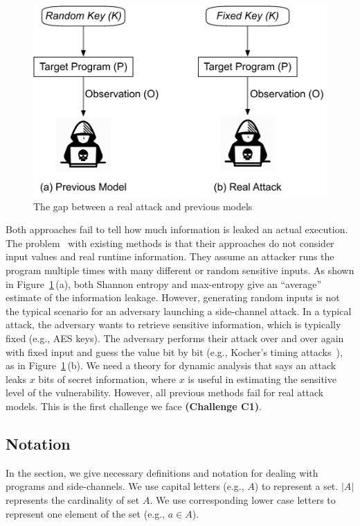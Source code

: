 \begin{figure}[h]
    \vspace*{-5pt}
    \centering
    \includegraphics[width=.65\columnwidth]{./figures/RA.pdf}
\vspace*{-2pt}
    \caption{The gap between a real attack and previous models}\label{fig:gap}
    \vspace*{-5pt}
\end{figure}

Both approaches fail to tell how much information is leaked an actual execution. 
The problem~\cite{Chattopadhyay:2017:QIL:3127041.3127044} with existing methods is that their approaches do not consider input values and 
real runtime information. 
They assume an attacker runs the program multiple times with many different or 
random sensitive inputs. As
shown in Figure~\ref{fig:gap}\,(a), both Shannon entropy and max-entropy
give an ``average'' estimate of the information leakage. However, generating random inputs is
not the typical scenario for an adversary launching a side-channel attack. In
a typical attack, the adversary wants to retrieve sensitive
information, which is typically fixed (e.g., AES keys).
The adversary performs their attack over and over again with fixed input and 
guess the value bit by
bit (e.g., Kocher's timing attacks~\cite{kocher1996timing}), as in Figure~\ref{fig:gap}\,(b). 
We need a theory for dynamic analysis that says an attack leaks $x$ bits of
secret information, where $x$ is useful in estimating the sensitive level of the vulnerability. 
However, all previous methods fail for real attack models. This is the first challenge we face
\textbf{(Challenge C1)}.

\subsection{Notation}
In the section, we give necessary definitions and notation for dealing with
programs and side-channels. We use capital letters (e.g., $A$) to represent a
set. $|A|$ represents the cardinality of set $A$. We use corresponding lower case
letters to represent one element of the set (e.g., $a \in A$).

